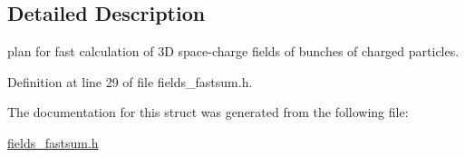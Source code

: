 \subsection{Detailed Description}
plan for fast calculation of 3D space-charge fields of bunches of charged particles. 



Definition at line 29 of file fields\_\-fastsum.h.

The documentation for this struct was generated from the following file:\begin{CompactItemize}
\item 
\hyperlink{fields__fastsum_8h}{fields\_\-fastsum.h}\end{CompactItemize}
